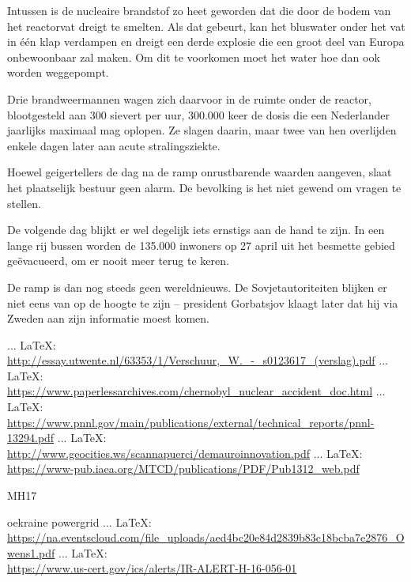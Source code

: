 \begin{thebibliography}{99}
{{{{{{Intussen is de nucleaire brandstof zo heet geworden dat die door de bodem van het reactorvat dreigt te smelten. Als dat gebeurt, kan het bluswater onder het vat in één klap verdampen en dreigt een derde explosie die een groot deel van Europa onbewoonbaar zal maken. Om dit te voorkomen moet het water hoe dan ook worden weggepompt.

Drie brandweermannen wagen zich daarvoor in de ruimte onder de reactor, blootgesteld aan 300 sievert per uur, 300.000 keer de dosis die een Nederlander jaarlijks maximaal mag oplopen. Ze slagen daarin, maar twee van hen overlijden enkele dagen later aan acute stralingsziekte.

Hoewel geigertellers de dag na de ramp onrustbarende waarden aangeven, slaat het plaatselijk bestuur geen alarm. De bevolking is het niet gewend om vragen te stellen.

De volgende dag blijkt er wel degelijk iets ernstigs aan de hand te zijn. In een lange rij bussen worden de 135.000 inwoners op 27 april uit het besmette gebied geëvacueerd, om er nooit meer terug te keren.

De ramp is dan nog steeds geen wereldnieuws. De Sovjetautoriteiten blijken er niet eens van op de hoogte te zijn – president Gorbatsjov klaagt later dat hij via Zweden aan zijn informatie moest komen.


 ... \LaTeX:\\ \url{http://essay.utwente.nl/63353/1/Verschuur,_W._-_s0123617_(verslag).pdf}
 ... \LaTeX:\\ \url{https://www.paperlessarchives.com/chernobyl_nuclear_accident_doc.html}
 ... \LaTeX:\\ \url{https://www.pnnl.gov/main/publications/external/technical_reports/pnnl-13294.pdf}
 ... \LaTeX:\\ \url{http://www.geocities.ws/scannapuerci/demauroinnovation.pdf}
 ... \LaTeX:\\ \url{https://www-pub.iaea.org/MTCD/publications/PDF/Pub1312_web.pdf}




MH17




oekraine powergrid
 ... \LaTeX:\\ \url{https://na.eventscloud.com/file_uploads/aed4bc20e84d2839b83c18bcba7e2876_Owens1.pdf}
 ... \LaTeX:\\ \url{https://www.us-cert.gov/ics/alerts/IR-ALERT-H-16-056-01}

}}}}}}
\end{thebibliography}
